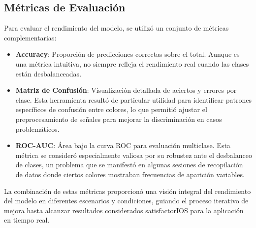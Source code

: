 \subsection{Métricas de Evaluación}
Para evaluar el rendimiento del modelo, se utilizó un conjunto de métricas complementarias:
\begin{itemize}
    \item \textbf{Accuracy}: Proporción de predicciones correctas sobre el total. Aunque es una métrica intuitiva, no siempre refleja el rendimiento real cuando las clases están desbalanceadas.
    
    \item \textbf{Matriz de Confusión}: Visualización detallada de aciertos y errores por clase. Esta herramienta resultó de particular utilidad para identificar patrones específicos de confusión entre colores, lo que permitió ajustar el preprocesamiento de señales para mejorar la discriminación en casos problemáticos.
    
    \item \textbf{ROC-AUC}: Área bajo la curva ROC para evaluación multiclase. Esta métrica se consideró especialmente valiosa por su robustez ante el desbalanceo de clases, un problema que se manifestó en algunas sesiones de recopilación de datos donde ciertos colores mostraban frecuencias de aparición variables.
\end{itemize}

La combinación de estas métricas proporcionó una visión integral del rendimiento del modelo en diferentes escenarios y condiciones, guiando el proceso iterativo de mejora hasta alcanzar resultados considerados satisfactorIOS para la aplicación en tiempo real.
